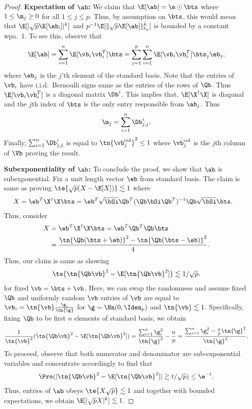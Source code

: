 \begin{proof}
\noindent\textbf{Expectation of $\ab$:} We claim that $\E[\ab]=\m\odot \bts$ where $1\leq \m_j\geq 0$ for all $1\leq j\leq p$. Thus, by assumption on $\bts$, this would mean that $\E[|\sqrt{p}\E[\ab_i]|^k]$ and $p^{-1}\E[\|\sqrt{p}\E[\ab]\|_{\ell_k}^k]$ is bounded by a constant wpa.~1. To see this, observe that
\[
\E[\ab]=\sum_{i=1}^n\E[\vb_i\vb_i^T]\bts=\sum_{j=1}^p\sum_{i=1}^n\E[\vb_i\vb_i^T]\bts_j \eb_j,
\]
where $\eb_j$ is the $j$'th element of the standard basis. Note that the entries of $\vb_i$ have i.i.d.~Bernoulli signs same as the entries of the rows of $\Qb$. Thus $\E[\vb_i\vb_i^T]$ is a diagonal matrix $\Db^i$. This implies that, $\E[\X^\dagger\X]$ is diagonal and the $j$th index of $\bts$ is the only entry responsible from $\ab_j$. Thus
\[
\m_j=\sum_{i=1}^n \Db^i_{j,j}.
\]
Finally, $\sum_{i=1}^n \Db^i_{j,j}$ is equal to $\tn{\vb^\text{col}_j}^2\leq 1$ where $\vb^\text{col}_j$ is the $j$th column of $\Vb$ proving the result.

\noindent\textbf{Subexponentiality of $\ab$:} To conclude the proof, we show that $\ab$ is subexponential. Fix a unit length vector $\eb$ from standard basis. The claim is same as proving $\te{\sqrt{p}(X-\E[X])}\lesssim 1$ where
\begin{align}
X&=\eb^T\X^\dagger\X\bts=\eb^T\sqrt{\bSi}\Qb^T (\Qb\bSi\Qb^T)^{-1}\Qb\sqrt{\bSi}\bts.
\end{align}
 Thus, consider
\begin{align}
X&=\eb^T\X^\dagger\X\bts=\eb^T\Qb^T\Qb\bts\\
&=\frac{\tn{\Qb(\bts+\eb)}^2-\tn{\Qb(\bts-\eb)}^2}{4}.
\end{align}
Thus, our claim is same as showing
\[
\te{\tn{\Qb\vb}^2-\E[\tn{\Qb\vb}^2]}\lesssim 1/\sqrt{p}.
\]
for fixed $\vb=\bts+\vb$. Here, we can swap the randomness and assume fixed $\Qb$ and uniformly random $\vb$ entries of $\vb$ are equal to $\vb_i=\tn{\vb}\frac{\g_i}{\tn{\g}}$ for $\g\sim\Nn(0,\Iden_p)$ and $\tn{\vb}\lesssim 1$. Specifically, fixing $\Qb$ to be first $n$ elements of standard basis, we obtain
\[
\frac{1}{\tn{\vb}^2}(\tn{\Qb\vb}^2-\E[\tn{\Qb\vb}^2])=\frac{\sum_{i=1}^n \g_i^2}{\tn{\g}^2}-\frac{n}{p}=\frac{\sum_{i=1}^n \g_i^2-\frac{n}{p}\tn{\g}^2}{\tn{\g}^2}.
\]
To proceed, observe that both numerator and denominator are sub-exponential variables and concentrate accordingly to find that
\[
\Pro(|\tn{\Qb\vb}^2-\E[\tn{\Qb\vb}^2]|\gtrsim t/\sqrt{p})\leq \e^{-t}.
\]
Thus, entries of $\ab$ obeys $\te{X\sqrt{p}}\lesssim 1$ and together with bounded expectations, we obtain $\E[|\sqrt{p}X|^k]\lesssim 1$.


\end{proof}
